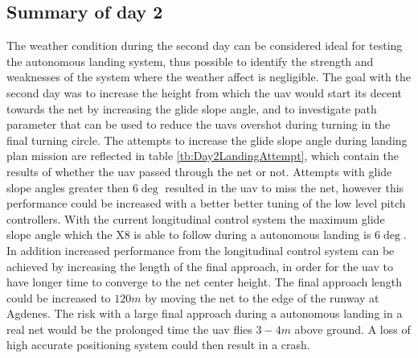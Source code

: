 \subsection{Summary of day 2}
The weather condition during the second day can be considered ideal for testing the autonomous landing system, thus possible to identify the strength and weaknesses of the system where the weather affect is negligible. The goal with the second day was to increase the height from which the \gls{uav} would start its decent towards the net by increasing the glide slope angle, and to investigate path parameter that can be used to reduce the \gls{uav}s overshot during turning in the final turning circle. The attempts to increase the glide slope angle during landing plan mission are reflected in table \ref{tb:Day2LandingAttempt}, which contain the results of whether the \gls{uav} passed through the net or not. Attempts with glide slope angles greater then $6 \deg$ resulted in the \gls{uav} to miss the net, however this performance could be increased with a better better tuning of the low level pitch controllers. With the current longitudinal control system the maximum glide slope angle which the X8 is able to follow during a autonomous landing is $6 \deg$. In addition increased performance from the longitudinal control system can be achieved by increasing the length of the final approach, in order for the \gls{uav} to have longer time to converge to the net center height. The final approach length could be increased to $120 m$ by moving the net to the edge of the runway at Agdenes. The risk with a large final approach during a autonomous landing in a real net would be the prolonged time the \gls{uav} flies $3-4 m$ above ground. A loss of high accurate positioning system could then result in a crash.

